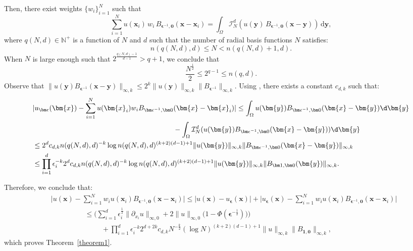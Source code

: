 Then, there exist weights $\{w_i\}_{i=1}^N$ such that
\begin{equation}
\sum_{i=1}^N u(\bm{x}_i)\, w_i \, B_{\bm{\epsilon}^{-1},\bm{0}}(\bm{x}-\bm{x}_i)
=
\int_{\Omega}
\mathcal{I}_N^d\!\left(
u(\bm{y})\, B_{\bm{\epsilon}^{-1},\bm{0}}(\bm{x}-\bm{y})
\right)\, \mathrm{d}\bm{y},
\end{equation}
where $q(N,d) \in \mathbb{N}^+$ is a function of $N$ and $d$ such that the number of radial basis functions $N$ satisfies:
\begin{equation}
    n(q(N, d), d)\leq N < n(q(N, d)+1, d). 
\end{equation}
When $N$ is large enough such that $2^{\frac{q(N, d)-1}{d-1}}>q+1$, we conclude that 
\begin{equation}
    \frac{N^{\frac{1}{2}}}{2}\leq 2^{q-1}\leq  n(q, d).
\end{equation}
Observe that $\|u(\bm{y})B_{\bm\epsilon^{-1}}(\bm{x}-\bm{y})\|_{\infty, k}\leq 2^k\|u(\bm{y})\|_{\infty, k}\|B_{\bm\epsilon^{-1}}\|_{\infty, k}$. Using \cite[Theorem 8]{barthelmann2000high}, there exists a constant $c_{d, k}$ such that:
\begin{equation}
\begin{aligned}
       &|u_{\bm\epsilon}(\bm{x}) - \sum_{i=1}^N u(\bm{x}_i)w_iB_{\bm\epsilon^{-1},\bm0}(\bm{x}-\bm{x}_i)|\leq \int_{\Omega} u(\bm{y})B_{\bm\epsilon^{-1},\bm0}(\bm{x}-\bm{y})\d\bm{y} \\
       &\hspace{7cm}-  \int_{\Omega} \mathcal{I}_N^d (u(\bm{y}) B_{\bm\epsilon^{-1},\bm0}(\bm{x}-\bm{y}))\d\bm{y}\\
       &\leq 2^dc_{d, k}n(q(N, d), d)^{-k}\log n(q(N, d), d)^{(k+2)(d-1)+1}\|u(\bm{y})\|_{\infty, k}\|B_{\bm\epsilon^{-1},\bm0}(\bm{x}-\bm{y})\|_{\infty, k}\\
       &\leq \prod_{i=1}^d\epsilon_i^{-k}2^dc_{d, k}n(q(N, d), d)^{-k}\log n(q(N, d), d)^{(k+2)(d-1)+1}\|u(\bm{y})\|_{\infty, k}\|B_{\bm1,\bm0}(\bm{y})\|_{\infty, k}.
\end{aligned}
\end{equation}


Therefore, we conclude that:
\begin{equation}
    \begin{aligned}
        &\big|u(\bm{x}) - \sum_{i=1}^Nw_iu(\bm{x}_i)B_{\bm\epsilon^{-1}, \bm0}(\bm{x}-\bm{x}_i)\big|\leq |u(\bm{x}) - u_{\bm\epsilon}(\bm{x})| + \big|u_{\bm \epsilon}(\bm{x}) - \sum_{i=1}^Nw_iu(\bm{x}_i)B_{\bm \epsilon^{-1},\bm0}(\bm{x}-\bm{x}_i)\big|\\
        &\hspace{2cm}\leq \bigg(\sum_{i=1}^d\epsilon_i^{\frac{1}{2}}\|\partial_{x_i}u\|_{\infty, 0} + 2\|u\|_{\infty, 0}\big(1-\Phi(\bm\epsilon^{-\frac{1}{2}})\big)\bigg) \\
        &\hspace{3cm}+ \prod_{i=1}^d\epsilon_i^{-k}2^{d+2k}c_{d, k}N^{-\frac{k}{2}}(\log N)^{(k+2)(d-1)+1}\|u\|_{\infty, k}\|B_{\bm 1, \bm0}\|_{\infty, k},
    \end{aligned}
    \label{error_bound0}
\end{equation}
which proves Theorem~\ref{theorem1}. 

